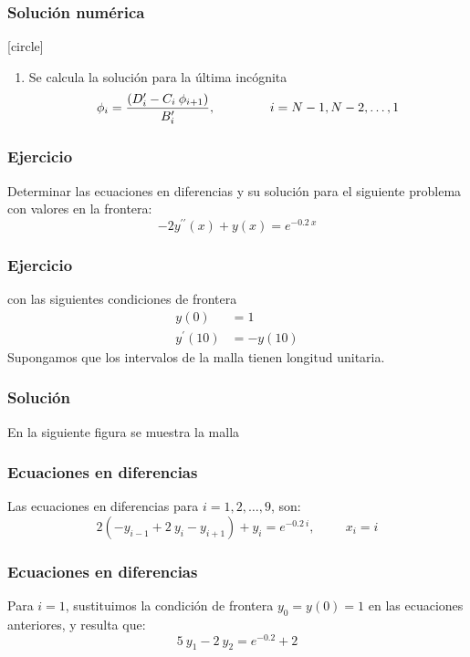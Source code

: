 \begin{frame}
\frametitle{Solución numérica}
[circle]
\begin{enumerate}[<+->]
\conti
\item Se calcula la solución para la última incógnita
\[ \phi_{i} = \dfrac{(D^{\prime}_{i} - C_{i} \: \phi_{i + 1})}{B^{\prime}_{i}}, \hspace{1.5 cm} i = N - 1, N - 2, \ldots, 1 \]
\end{enumerate}
\end{frame}
\begin{frame}
\frametitle{Ejercicio}
Determinar las ecuaciones en diferencias y su solución para el siguiente problema con valores en la frontera:
\[ -2y^{\prime \prime}(x) + y(x) = e^{-0.2 \: x} \]
\end{frame}
\begin{frame}
\frametitle{Ejercicio}
con las siguientes condiciones de frontera
\[ \begin{split} 
y(0) &= 1 \\
y^{\prime}(10) &= -y(10)
\end{split} \]
Supongamos que los intervalos de la malla tienen longitud unitaria.
\end{frame}
\begin{frame}
\frametitle{Solución}
En la siguiente figura se muestra la malla
\begin{center}
\end{center}
\end{frame}
\begin{frame}
\frametitle{Ecuaciones en diferencias}
Las ecuaciones en diferencias para $i = 1, 2, \ldots, 9$, son:
\[ 2(-y_{i - 1} + 2 \: y_{i} - y_{i + 1}) + y_{i} = e^{-0.2 \: i}, \hspace{1cm} x_{i} = i \]
\end{frame}
\begin{frame}
\frametitle{Ecuaciones en diferencias}
Para $i=1$, sustituimos la condición de frontera $y_{0}=y(0)=1$ en las ecuaciones anteriores, y resulta que:
\[ 5 \: y_{1} - 2 \: y_{2} = e^{-0.2} + 2\]
\end{frame}
